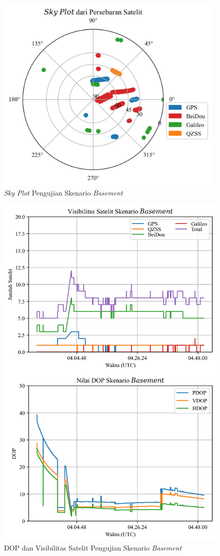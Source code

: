 \begin{figure}[H]
	\centering
	\includegraphics[width=11cm]{contents/chapter-4/1-skenario-basement/sky_plot.png}
	\caption{\textit{Sky Plot} Pengujian Skenario \textit{Basement}}
	\label{Fig: basement-skyplot}
\end{figure}

\begin{figure}[H]
	\centering
	\includegraphics[width=12cm]{contents/chapter-4/1-skenario-basement/sats_dop.png}
	\caption{DOP dan Visibilitas Satelit Pengujian Skenario \textit{Basement}}
	\label{Fig: basement-sats_dop}
\end{figure}

